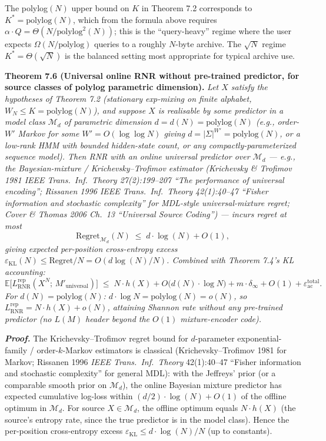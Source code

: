 \documentclass[
]{article}
\begin{document}
The polylog$(N)$ upper bound on $K$ in Theorem 7.2 corresponds to
$K^* = \mathrm{polylog}(N)$, which from the formula above requires
$\alpha \cdot Q = \Theta(N / \mathrm{polylog}^2(N))$; this is the
``query-heavy'' regime where the user expects $\Omega(N / \mathrm{polylog})$
queries to a roughly $N$-byte archive. The $\sqrt{N}$ regime
$K^* = \Theta(\sqrt{N})$ is the balanced setting most appropriate for
typical archive use.

\textbf{Theorem 7.6 (Universal online RNR without pre-trained predictor,
for source classes of polylog parametric dimension).}
\emph{Let $X$ satisfy the hypotheses of Theorem 7.2 (stationary
exp-mixing on finite alphabet, $W_N \leq K = \mathrm{polylog}(N)$), and
suppose $X$ is realisable by some predictor in a model class
$\mathcal{M}_d$ of parametric dimension $d = d(N) = \mathrm{polylog}(N)$
(e.g., order-$W'$ Markov for some $W' = O(\log \log N)$ giving $d =
|\Sigma|^{W'} = \mathrm{polylog}(N)$, or a low-rank HMM with bounded
hidden-state count, or any compactly-parameterized sequence model).
Then RNR with an \emph{online universal predictor} over $\mathcal{M}_d$
--- e.g., the Bayesian-mixture / Krichevsky--Trofimov estimator
(Krichevsky \& Trofimov 1981 \emph{IEEE Trans.\ Inf.\ Theory}
27(2):199--207 ``The performance of universal encoding''; Rissanen 1996
\emph{IEEE Trans.\ Inf.\ Theory} 42(1):40--47 ``Fisher information
and stochastic complexity'' for MDL-style universal-mixture regret;
Cover \& Thomas 2006 Ch.\ 13 ``Universal Source Coding'') ---
incurs regret at most}
\[
\mathrm{Regret}_{\mathcal{M}_d}(N) \;\leq\; d \cdot \log(N) + O(1),
\]
\emph{giving expected per-position cross-entropy excess
$\varepsilon_{\mathrm{KL}}(N) \leq \mathrm{Regret}/N =
O(d \log(N) / N)$. Combined with Theorem 7.4's KL accounting:}
\[
\mathbb{E}\bigl[L^{\mathrm{rep}}_{\mathrm{RNR}}(X^N;\,M'_{\text{universal}})\bigr]
\;\leq\;
N \cdot h(X) + O\bigl(d(N) \cdot \log N\bigr) + m \cdot \delta_\infty + O(1) + \varepsilon_{\mathrm{ac}}^{\mathrm{total}}.
\]
\emph{For $d(N) = \mathrm{polylog}(N)$: $d \cdot \log N = \mathrm{polylog}(N) =
o(N)$, so $L^{\mathrm{rep}}_{\mathrm{RNR}} = N \cdot h(X) + o(N)$,
attaining Shannon rate \emph{without any pre-trained predictor}
(no $L(M)$ header beyond the $O(1)$ mixture-encoder code).}

\emph{\textbf{Proof.}} The Krichevsky--Trofimov regret bound for
$d$-parameter exponential-family / order-$k$-Markov estimators is
classical (Krichevsky--Trofimov 1981 for Markov; Rissanen 1996
\emph{IEEE Trans.\ Inf.\ Theory} 42(1):40--47 ``Fisher information
and stochastic complexity'' for general MDL): with the Jeffreys'
prior (or a comparable smooth prior on $\mathcal{M}_d$), the online
Bayesian mixture predictor has expected cumulative log-loss within
$(d/2) \cdot \log(N) + O(1)$ of the offline optimum in $\mathcal{M}_d$.
For source $X \in \mathcal{M}_d$, the offline optimum equals
$N \cdot h(X)$ (the source's entropy rate, since the true predictor
is in the model class). Hence the per-position cross-entropy excess
$\varepsilon_{\mathrm{KL}} \leq d \cdot \log(N) / N$ (up to constants).
\end{document}
